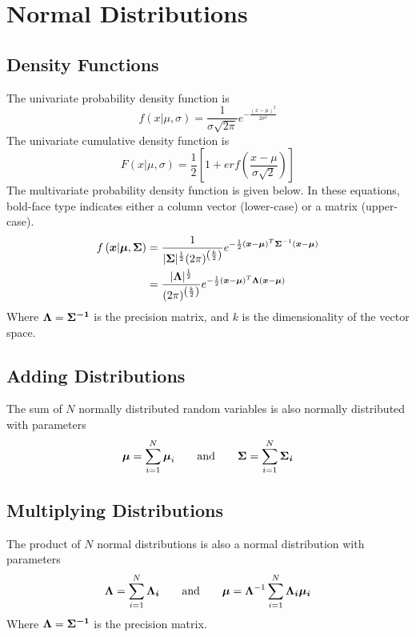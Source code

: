 \documentclass[../../main.tex]{subfiles}
\begin{document}
\chapter{Normal Distributions}
\section{Density Functions}
The univariate probability density function is
\begin{equation}
    \label{eq:uninormaldens}
    f\left(x| \mu, \sigma \right) =
    \frac{1}{\sigma\sqrt{2\pi}}e^{-\frac{(x - \mu)^2}{2\sigma^2}}
\end{equation}
The univariate cumulative density function is
\begin{equation}
    \label{eq:uninormalcum}
    F\left(x| \mu, \sigma \right) =
    \frac{1}{2}\left[ 1 + erf\left(\frac{x - \mu}{\sigma \sqrt{2}}  \right) \right]
\end{equation}
The multivariate probability density function is given below.  In these
equations, bold-face type indicates either a column vector (lower-case) or a
matrix (upper-case).
\begin{align}
    \label{eq:multinormaldens}
    f\left(\boldsymbol{x}| \boldsymbol{\mu}, \boldsymbol{\Sigma} \right)
    &= \frac{1}{
            |\boldsymbol{\Sigma}|^\frac{1}{2} (2\pi)^{\left(\frac{k}{2}\right)}
        }
        e^{
            -\frac{1}{2}
            (\boldsymbol{x} - \boldsymbol{\mu})^T
            \boldsymbol{\Sigma}^{-1}
            (\boldsymbol{x} - \boldsymbol{\mu})
    }\\
    &= \frac{|\boldsymbol{\Lambda}|^\frac{1}{2}}{
             (2\pi)^{\left(\frac{k}{2}\right)}
        }
        e^{
            -\frac{1}{2}
            (\boldsymbol{x} - \boldsymbol{\mu})^T
            \boldsymbol{\Lambda}
            (\boldsymbol{x} - \boldsymbol{\mu})
    }\nonumber
\end{align}
Where $\boldsymbol{\Lambda} = \boldsymbol{\Sigma^{-1}}$ is the precision
matrix, and $k$ is the dimensionality of the vector space.


\section{Adding Distributions}
The sum of $N$ normally distributed random variables is also normally
distributed with parameters
\begin{equation}
    \label{eq:sum_normal_mu_var}
    \boldsymbol{\mu} = \sum\limits_{i=1}^{N}\boldsymbol{\mu}_i
    \qquad\text{and}\qquad
    \boldsymbol{\Sigma} = \sum\limits_{i=1}^{N}\boldsymbol{\Sigma_i}
\end{equation}

\section{Multiplying Distributions}
The product of $N$ normal distributions is also a normal distribution with
parameters
\begin{equation}
    \label{eq:sum_normal_mu_var}
    \boldsymbol{\Lambda} = \sum\limits_{i=1}^{N}\boldsymbol{\Lambda_i}
    \qquad\text{and}\qquad
    \boldsymbol{\mu} = \boldsymbol{\Lambda}^{-1}\sum\limits_{i=1}^{N}\boldsymbol{\Lambda_i\mu_i}
\end{equation}
Where $\boldsymbol{\Lambda} = \boldsymbol{\Sigma^{-1}}$ is the precision
matrix.
\end{document}
